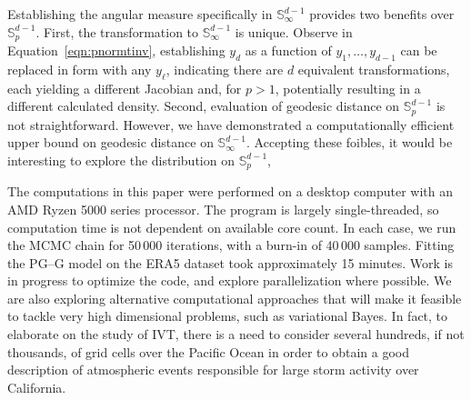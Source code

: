 Establishing the angular measure
    specifically in $\mathbb{S}_{\infty}^{d-1}$ provides two benefits over 
    $\mathbb{S}_p^{d-1}$.  First, the transformation to 
    $\mathbb{S}_{\infty}^{d-1}$ is unique.  Observe in 
    Equation~\eqref{eqn:pnormtinv}, establishing $y_d$ as a function
    of $y_1,\ldots,y_{d-1}$ can be replaced in form with any $y_{\ell}$, 
    indicating there are $d$ equivalent transformations, each yielding a different
    Jacobian and, for $p>1$, potentially resulting in a different calculated density.  
    Second, evaluation of geodesic distance on $\mathbb{S}_p^{d-1}$ is not 
    straightforward.  However, we have demonstrated a computationally efficient 
    upper bound on geodesic distance on $\mathbb{S}_{\infty}^{d-1}$.  Accepting
    these foibles, it would be interesting to explore the distribution on 
    $\mathbb{S}_{p}^{d-1}$, 
 

The computations in this paper were performed on a desktop computer with an 
    AMD Ryzen 5000 series processor. The program is largely single-threaded, so 
    computation time is not dependent on available core count.  In each case, 
    we run the MCMC chain for 50\,000 iterations, with a burn-in of 40\,000 
    samples.  Fitting the PG--G model on the ERA5 dataset took approximately 
    15 minutes.  Work is in progress to optimize the code, and explore 
    parallelization where possible.  We are also exploring alternative 
    computational approaches that will make it feasible to tackle very high 
    dimensional problems, such as variational Bayes. In fact, to elaborate on 
    the study of IVT, there is a need to consider several hundreds, if not thousands, 
    of grid cells over the Pacific Ocean in order to obtain a good description of 
    atmospheric events responsible for large storm activity over California.  

